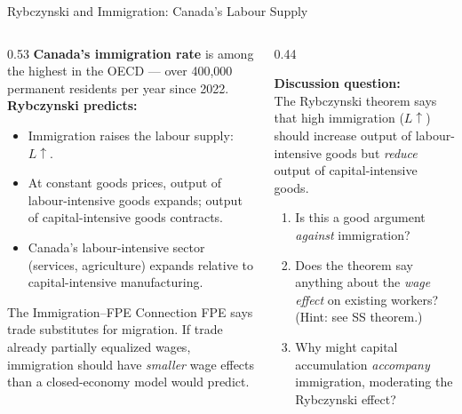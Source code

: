 \documentclass[aspectratio=169]{beamer}
\begin{document}
\begin{frame}[shrink=15]{Rybczynski and Immigration: Canada's Labour Supply}
\begin{columns}[T]
\begin{column}{0.53\textwidth}
\textbf{Canada's immigration rate} is among the
highest in the OECD --- over 400,000 permanent
residents per year since 2022.\\[0.4em]
\textbf{Rybczynski predicts:}
\begin{itemize}\small
  \item Immigration raises the labour supply:
        $L\uparrow$.
  \item At constant goods prices, output of
        labour-intensive goods expands; output of
        capital-intensive goods contracts.
  \item Canada's labour-intensive sector
        (services, agriculture) expands relative
        to capital-intensive manufacturing.
\end{itemize}
\vspace{0.3em}
\begin{insight}{The Immigration--FPE Connection}
\small FPE says trade substitutes for migration.
If trade already partially equalized wages,
immigration should have \emph{smaller} wage
effects than a closed-economy model would
predict.
\end{insight}
\end{column}
\begin{column}{0.44\textwidth}
\begin{discuss}
\small
\textbf{Discussion question:}\\[0.3em]
The Rybczynski theorem says that high immigration
($L\uparrow$) should increase output of
labour-intensive goods but \emph{reduce} output
of capital-intensive goods.\\[0.3em]
\begin{enumerate}
  \item Is this a good argument \emph{against}
        immigration?
  \item Does the theorem say anything about the
        \emph{wage effect} on existing workers?
        (Hint: see SS theorem.)
  \item Why might capital accumulation
        \emph{accompany} immigration, moderating
        the Rybczynski effect?
\end{enumerate}
\end{discuss}
\end{column}
\end{columns}
\end{frame}
\end{document}
